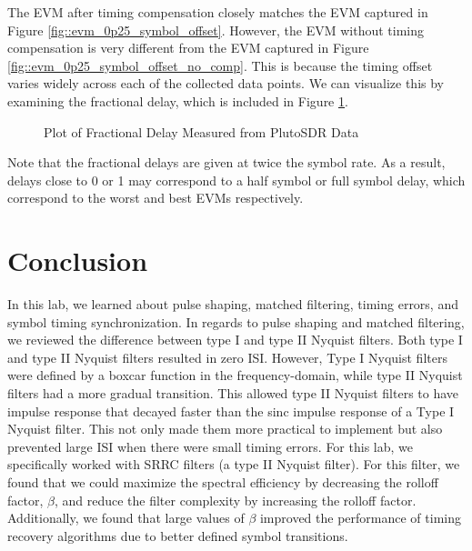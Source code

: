 \documentclass{article}
\begin{document}
\noindent The EVM after timing compensation closely matches the EVM captured in Figure \ref{fig::evm_0p25_symbol_offset}. However, the EVM without timing compensation is very different from the EVM captured in Figure \ref{fig::evm_0p25_symbol_offset_no_comp}. This is because the timing offset varies widely across each of the collected data points. We can visualize this by examining the fractional delay, which is included in Figure \ref{fig::pluto_fractional_delay}.

\begin{figure}[H]
	\centerline{}
	\caption{Plot of Fractional Delay Measured from PlutoSDR Data}
	\label{fig::pluto_fractional_delay}
\end{figure}

\noindent Note that the fractional delays are given at twice the symbol rate. As a result, delays close to 0 or 1 may correspond to a half symbol or full symbol delay, which correspond to the worst and best EVMs respectively.

\section{Conclusion}

In this lab, we learned about pulse shaping, matched filtering, timing errors, and symbol timing synchronization. In regards to pulse shaping and matched filtering, we reviewed the difference between type I and type II Nyquist filters. Both type I and type II Nyquist filters resulted in zero ISI. However, Type I Nyquist filters were defined by a boxcar function in the frequency-domain, while type II Nyquist filters had a more gradual transition. This allowed type II Nyquist filters to have impulse response that decayed faster than the sinc impulse response of a Type I Nyquist filter. This not only made them more practical to implement but also prevented large ISI when there were small timing errors. For this lab, we specifically worked with SRRC filters (a type II Nyquist filter). For this filter, we found that we could maximize the spectral efficiency by decreasing the rolloff factor, $\beta$, and reduce the filter complexity by increasing the rolloff factor. Additionally, we found that large values of $\beta$ improved the performance of timing recovery algorithms due to better defined symbol transitions.
\end{document}
